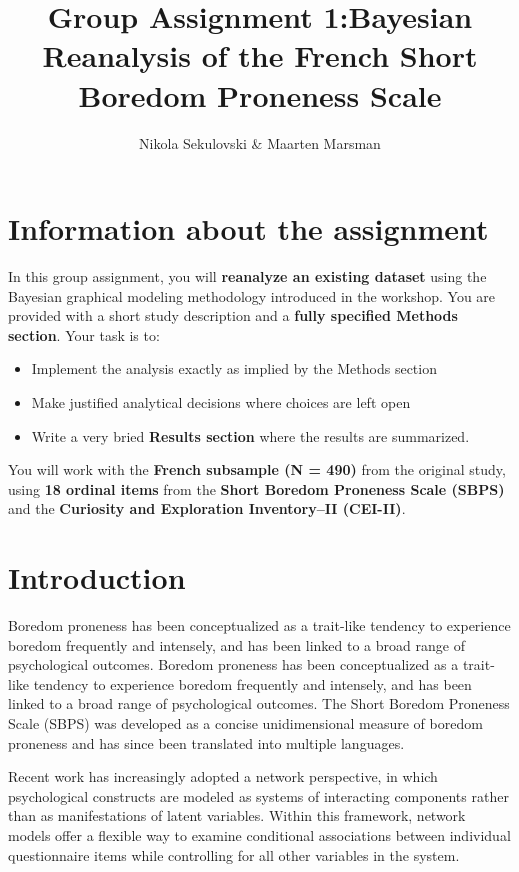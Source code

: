 \documentclass[
  letterpaper,
  DIV=11,
  numbers=noendperiod]{scrartcl}
\title{Group Assignment 1:Bayesian Reanalysis of the French Short
Boredom Proneness Scale}
\author{Nikola Sekulovski \& Maarten Marsman}
\date{}
\providecommand{\tightlist}{%
  \setlength{\itemsep}{0pt}\setlength{\parskip}{0pt}}
\begin{document}
\maketitle


\section{Information about the
assignment}\label{information-about-the-assignment}

In this group assignment, you will \textbf{reanalyze an existing
dataset} using the Bayesian graphical modeling methodology introduced in
the workshop. You are provided with a short study description and a
\textbf{fully specified Methods section}. Your task is to:

\begin{itemize}
\tightlist
\item
  Implement the analysis exactly as implied by the Methods section
\item
  Make justified analytical decisions where choices are left open
\item
  Write a very bried \textbf{Results section} where the results are
  summarized.
\end{itemize}

You will work with the \textbf{French subsample (N = 490)} from the
original study, using \textbf{18 ordinal items} from the \textbf{Short
Boredom Proneness Scale (SBPS)} and the \textbf{Curiosity and
Exploration Inventory--II (CEI-II)}.

\newpage

\section{Introduction}\label{introduction}

Boredom proneness has been conceptualized as a trait-like tendency to
experience boredom frequently and intensely, and has been linked to a
broad range of psychological outcomes. Boredom proneness has been
conceptualized as a trait-like tendency to experience boredom frequently
and intensely, and has been linked to a broad range of psychological
outcomes. The Short Boredom Proneness Scale (SBPS) was developed as a
concise unidimensional measure of boredom proneness and has since been
translated into multiple languages.

Recent work has increasingly adopted a network perspective, in which
psychological constructs are modeled as systems of interacting
components rather than as manifestations of latent variables. Within
this framework, network models offer a flexible way to examine
conditional associations between individual questionnaire items while
controlling for all other variables in the system.
\end{document}
